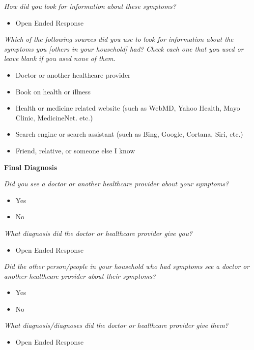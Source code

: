 \documentclass[12pt]{article}
\begin{document}
\emph{How did you look for information about these symptoms?}
\begin{itemize}
\item Open Ended Response
\end{itemize}

\emph{Which of the following sources did you use to look for information about the symptoms you [others in your household] had? Check each one that you used or leave blank if you used none of them.}
\begin{itemize}
\item Doctor or another healthcare provider	
\item Book on health or illness
\item Health or medicine related website (such as WebMD, Yahoo Health, Mayo Clinic, MedicineNet. etc.)
\item Search engine or search assistant (such as Bing, Google, Cortana, Siri, etc.)
\item Friend, relative, or someone else I know
\end{itemize}
 
\textbf{Final Diagnosis}

\emph{Did you see a doctor or another healthcare provider about your symptoms?}
\begin{itemize}
\item Yes
\item No
\end{itemize}

\emph{What diagnosis did the doctor or healthcare provider give you?}
\begin{itemize}
\item Open Ended Response
\end{itemize}
 
\emph{Did the other person/people in your household who had symptoms see a doctor or another healthcare provider about their symptoms?}
\begin{itemize}
\item Yes
\item No
\end{itemize}

\emph{What diagnosis/diagnoses did the doctor or healthcare provider give them?}
\begin{itemize}
\item Open Ended Response
\end{itemize}


\end{document}
